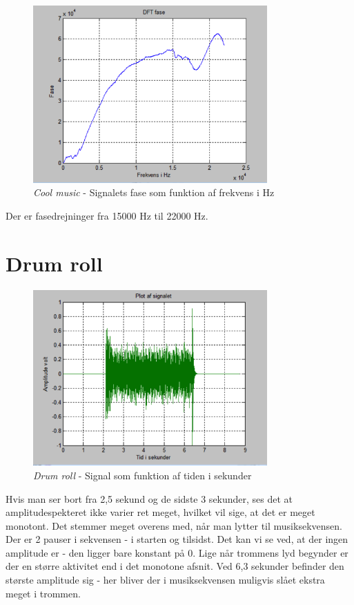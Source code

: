 \begin{figure}[H]
	\centering
	\includegraphics[width=0.8\textwidth]{Figurer/Snip20151001_6}
	\caption{\textit{Cool music} - Signalets fase som funktion af frekvens i Hz}
\end{figure} 

Der er fasedrejninger fra 15000 Hz til 22000 Hz. 

\section{Drum roll}
 
\begin{figure}[H]
	\centering
	\includegraphics[width=0.8\textwidth]{Figurer/Snip20151001_9}
	\caption{\textit{Drum roll} - Signal som funktion af tiden i sekunder}
\end{figure}

Hvis man ser bort fra 2,5 sekund og de sidste 3 sekunder, ses det at amplitudespekteret ikke varier ret meget, hvilket vil sige, at det er meget monotont. Det stemmer meget overens med, når man lytter til musiksekvensen. Der er 2 pauser i sekvensen - i starten og tilsidst. Det kan vi se ved, at der ingen amplitude er - den ligger bare konstant på 0. Lige når trommens lyd begynder er der en større aktivitet end i det monotone afsnit. Ved 6,3 sekunder befinder den største amplitude sig - her bliver der i musiksekvensen muligvis slået ekstra meget i trommen.  

